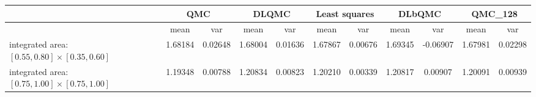\begin{tabular}{|l|c|c|c|c|c|c|c|c|c|c|}
\hline
 &\multicolumn{2}{c|}{\textbf{QMC}}&\multicolumn{2}{c|}{\textbf{DLQMC}}&\multicolumn{2}{c|}{\textbf{Least squares}}&\multicolumn{2}{c|}{\textbf{DLbQMC}}&\multicolumn{2}{c|}{\textbf{QMC\_128}}\\ 
\hline

 &mean&var&mean&var&mean&var&mean&var&mean&var\\ 
\hline
integrated area: $[0.55,0.80]\times [0.35,0.60]$ &1.68184&0.02648&1.68004&0.01636&1.67867&0.00676&1.69345&-0.06907&1.67981&0.02298\\ 
\hline
integrated area: $[0.75,1.00]\times [0.75,1.00]$ &1.19348&0.00788&1.20834&0.00823&1.20210&0.00339&1.20817&0.00907&1.20091&0.00939\\ 
\hline
\end{tabular}

